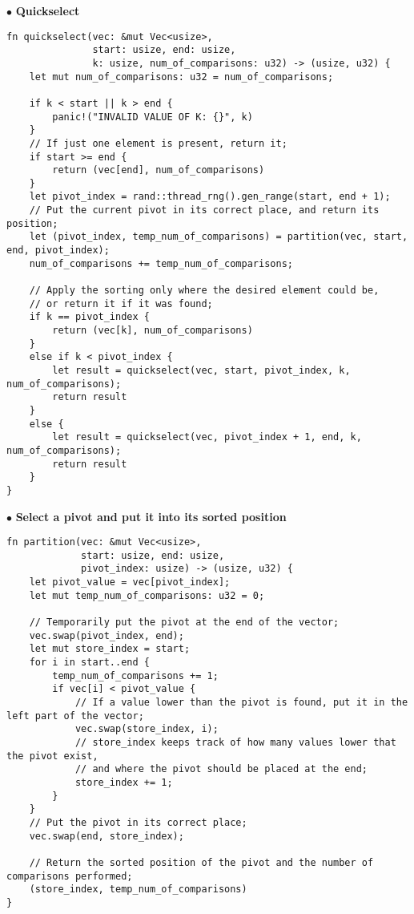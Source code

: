 \documentclass[
12pt,
a4paper,
oneside,
headinclude,
footinclude]{article}
\begin{document}
$\bullet$ \textbf{Quickselect}
\begin{verbatim}
fn quickselect(vec: &mut Vec<usize>, 
               start: usize, end: usize, 
               k: usize, num_of_comparisons: u32) -> (usize, u32) {
    let mut num_of_comparisons: u32 = num_of_comparisons;

    if k < start || k > end {
        panic!("INVALID VALUE OF K: {}", k)
    }
    // If just one element is present, return it;
    if start >= end {
        return (vec[end], num_of_comparisons)
    }
    let pivot_index = rand::thread_rng().gen_range(start, end + 1);
    // Put the current pivot in its correct place, and return its position;
    let (pivot_index, temp_num_of_comparisons) = partition(vec, start, end, pivot_index);
    num_of_comparisons += temp_num_of_comparisons;

    // Apply the sorting only where the desired element could be,
    // or return it if it was found;
    if k == pivot_index {
        return (vec[k], num_of_comparisons)
    }
    else if k < pivot_index {
        let result = quickselect(vec, start, pivot_index, k, num_of_comparisons);
        return result
    }
    else {
        let result = quickselect(vec, pivot_index + 1, end, k, num_of_comparisons);
        return result
    }
}
\end{verbatim}

$\bullet$ \textbf{Select a pivot and put it into its sorted position}
\begin{verbatim}
fn partition(vec: &mut Vec<usize>, 
             start: usize, end: usize,
             pivot_index: usize) -> (usize, u32) {
    let pivot_value = vec[pivot_index];
    let mut temp_num_of_comparisons: u32 = 0;

    // Temporarily put the pivot at the end of the vector;
    vec.swap(pivot_index, end);
    let mut store_index = start;
    for i in start..end {
        temp_num_of_comparisons += 1;
        if vec[i] < pivot_value {
            // If a value lower than the pivot is found, put it in the left part of the vector;
            vec.swap(store_index, i);
            // store_index keeps track of how many values lower that the pivot exist,
            // and where the pivot should be placed at the end;
            store_index += 1;
        }
    }
    // Put the pivot in its correct place;
    vec.swap(end, store_index);

    // Return the sorted position of the pivot and the number of comparisons performed;
    (store_index, temp_num_of_comparisons)
}

\end{verbatim}
\end{document}
